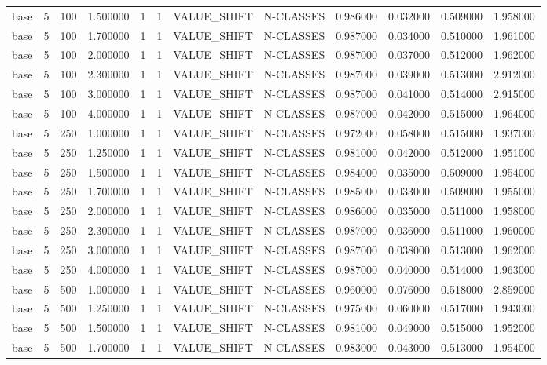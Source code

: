 \begin{tabular}{lrrrllllrrrr}
base & 5 & 100 & 1.500000 & 1 & 1 & VALUE_SHIFT & N-CLASSES & 0.986000 & 0.032000 & 0.509000 & 1.958000 \\
base & 5 & 100 & 1.700000 & 1 & 1 & VALUE_SHIFT & N-CLASSES & 0.987000 & 0.034000 & 0.510000 & 1.961000 \\
base & 5 & 100 & 2.000000 & 1 & 1 & VALUE_SHIFT & N-CLASSES & 0.987000 & 0.037000 & 0.512000 & 1.962000 \\
base & 5 & 100 & 2.300000 & 1 & 1 & VALUE_SHIFT & N-CLASSES & 0.987000 & 0.039000 & 0.513000 & 2.912000 \\
base & 5 & 100 & 3.000000 & 1 & 1 & VALUE_SHIFT & N-CLASSES & 0.987000 & 0.041000 & 0.514000 & 2.915000 \\
base & 5 & 100 & 4.000000 & 1 & 1 & VALUE_SHIFT & N-CLASSES & 0.987000 & 0.042000 & 0.515000 & 1.964000 \\
base & 5 & 250 & 1.000000 & 1 & 1 & VALUE_SHIFT & N-CLASSES & 0.972000 & 0.058000 & 0.515000 & 1.937000 \\
base & 5 & 250 & 1.250000 & 1 & 1 & VALUE_SHIFT & N-CLASSES & 0.981000 & 0.042000 & 0.512000 & 1.951000 \\
base & 5 & 250 & 1.500000 & 1 & 1 & VALUE_SHIFT & N-CLASSES & 0.984000 & 0.035000 & 0.509000 & 1.954000 \\
base & 5 & 250 & 1.700000 & 1 & 1 & VALUE_SHIFT & N-CLASSES & 0.985000 & 0.033000 & 0.509000 & 1.955000 \\
base & 5 & 250 & 2.000000 & 1 & 1 & VALUE_SHIFT & N-CLASSES & 0.986000 & 0.035000 & 0.511000 & 1.958000 \\
base & 5 & 250 & 2.300000 & 1 & 1 & VALUE_SHIFT & N-CLASSES & 0.987000 & 0.036000 & 0.511000 & 1.960000 \\
base & 5 & 250 & 3.000000 & 1 & 1 & VALUE_SHIFT & N-CLASSES & 0.987000 & 0.038000 & 0.513000 & 1.962000 \\
base & 5 & 250 & 4.000000 & 1 & 1 & VALUE_SHIFT & N-CLASSES & 0.987000 & 0.040000 & 0.514000 & 1.963000 \\
base & 5 & 500 & 1.000000 & 1 & 1 & VALUE_SHIFT & N-CLASSES & 0.960000 & 0.076000 & 0.518000 & 2.859000 \\
base & 5 & 500 & 1.250000 & 1 & 1 & VALUE_SHIFT & N-CLASSES & 0.975000 & 0.060000 & 0.517000 & 1.943000 \\
base & 5 & 500 & 1.500000 & 1 & 1 & VALUE_SHIFT & N-CLASSES & 0.981000 & 0.049000 & 0.515000 & 1.952000 \\
base & 5 & 500 & 1.700000 & 1 & 1 & VALUE_SHIFT & N-CLASSES & 0.983000 & 0.043000 & 0.513000 & 1.954000 \\

\end{tabular}
